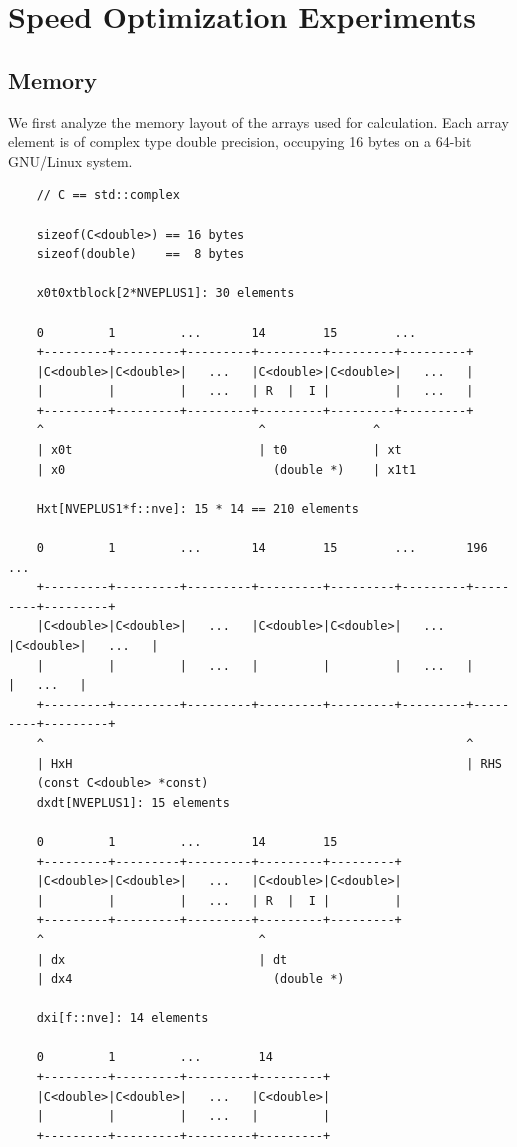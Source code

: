 \section{Speed Optimization Experiments}

\subsection{Memory}
We first analyze the memory layout of the arrays used for calculation. Each
array element is of complex type double precision, occupying 16 bytes on a
64-bit GNU/Linux system.
\tiny\begin{verbatim}
    // C == std::complex

    sizeof(C<double>) == 16 bytes
    sizeof(double)    ==  8 bytes

    x0t0xtblock[2*NVEPLUS1]: 30 elements

    0         1         ...       14        15        ...
    +---------+---------+---------+---------+---------+---------+
    |C<double>|C<double>|   ...   |C<double>|C<double>|   ...   |
    |         |         |   ...   | R  |  I |         |   ...   |
    +---------+---------+---------+---------+---------+---------+
    ^                              ^               ^
    | x0t                          | t0            | xt
    | x0                             (double *)    | x1t1

    Hxt[NVEPLUS1*f::nve]: 15 * 14 == 210 elements

    0         1         ...       14        15        ...       196       ...
    +---------+---------+---------+---------+---------+---------+---------+---------+
    |C<double>|C<double>|   ...   |C<double>|C<double>|   ...   |C<double>|   ...   |
    |         |         |   ...   |         |         |   ...   |         |   ...   |
    +---------+---------+---------+---------+---------+---------+---------+---------+
    ^                                                           ^
    | HxH                                                       | RHS
    (const C<double> *const)
    dxdt[NVEPLUS1]: 15 elements

    0         1         ...       14        15
    +---------+---------+---------+---------+---------+
    |C<double>|C<double>|   ...   |C<double>|C<double>|
    |         |         |   ...   | R  |  I |         |
    +---------+---------+---------+---------+---------+
    ^                              ^
    | dx                           | dt
    | dx4                            (double *)

    dxi[f::nve]: 14 elements

    0         1         ...        14
    +---------+---------+---------+---------+
    |C<double>|C<double>|   ...   |C<double>|
    |         |         |   ...   |         |
    +---------+---------+---------+---------+

\end{verbatim}
\normalsize

